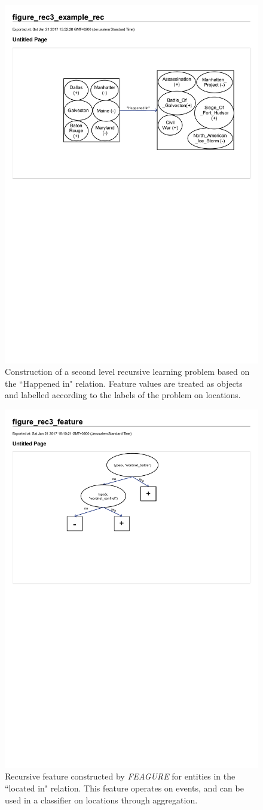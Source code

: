 \documentclass[twoside,11pt]{article}
\theoremstyle{definition}
\begin{document}
\begin{figure}[!h]
	\centering
	\includegraphics[width=0.7\linewidth]{figure_rec3_example_rec}
	\caption{Construction of a second level recursive learning problem based on the ``Happened in" relation. Feature values are treated as objects and labelled according to the labels of the problem on locations.}
	\label{fig:figure_rec3_example_rec}
\end{figure}

\begin{figure}[!h]
	\centering
	\includegraphics[width=0.4\linewidth]{figure_rec3_feature}
	\caption{Recursive feature constructed by \emph{FEAGURE} for entities in the ``located in" relation. This feature operates on events, and can be used in a classifier on locations through aggregation.}
	\label{fig:figure_rec3_feature}
\end{figure}
\end{document}
